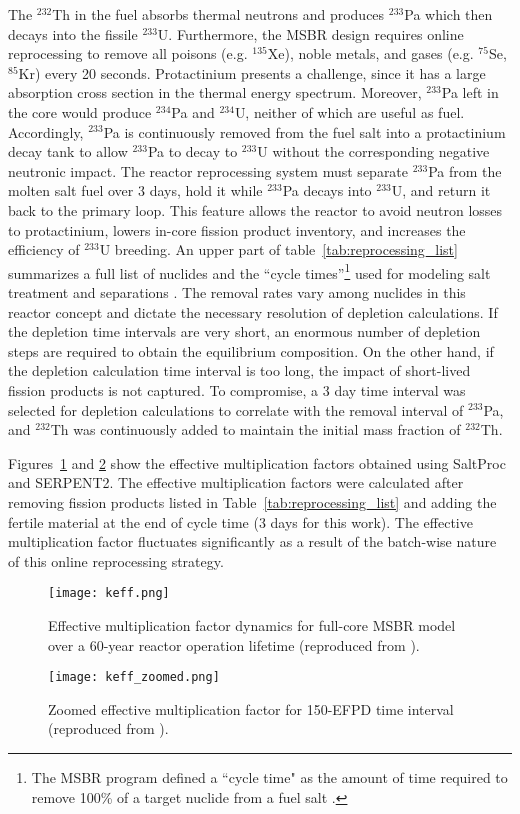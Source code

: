 The $^{232}$Th in the fuel absorbs thermal neutrons and produces $^{233}$Pa 
which then decays into the fissile $^{233}$U. Furthermore, the \gls{MSBR} 
design requires online reprocessing to remove all poisons (e.g. $^{135}$Xe), 
noble metals, and gases (e.g. $^{75}$Se, $^{85}$Kr) every 20 seconds. 
Protactinium presents a challenge, since it has a large absorption cross 
section in the thermal energy spectrum. Moreover, $^{233}$Pa left in the core
would produce $^{234}$Pa and $^{234}$U, neither of which are useful as fuel. 
Accordingly, $^{233}$Pa is continuously 
removed from the fuel salt into a protactinium decay tank to allow $^{233}$Pa 
to decay to $^{233}$U without the corresponding negative neutronic impact. The reactor 
reprocessing system must separate $^{233}$Pa from the molten salt fuel over 3 
days, hold it while $^{233}$Pa decays into $^{233}$U, and return it back to the 
primary loop. This feature allows the reactor to avoid neutron losses to 
protactinium, lowers in-core fission product inventory, and increases the 
efficiency of $^{233}$U breeding. An upper part of table~\ref{tab:reprocessing_list} 
summarizes a full list of nuclides and the ``cycle times''\footnote{ The \gls{MSBR} 
program defined a ``cycle time" as the amount of time required to remove 100\% of 
a target nuclide from a fuel 
salt \cite{robertson_conceptual_1971}.} used for modeling salt treatment and 
separations \cite{robertson_conceptual_1971}. 
The removal rates vary among nuclides in this reactor concept and dictate the 
necessary resolution of depletion calculations. If the depletion time intervals 
are very short, an enormous number of depletion steps are required to obtain 
the equilibrium composition. On the other hand, if the depletion  calculation 
time interval is too long, the impact of short-lived fission products is not 
captured. To compromise, a 3 day time interval was selected for depletion 
calculations to correlate with the removal interval of 
$^{233}$Pa, and $^{232}$Th was continuously added to maintain the initial mass 
fraction of $^{232}$Th.

Figures~\ref{fig:keff} and \ref{fig:keff_zoomed} show the effective multiplication factors 
obtained using SaltProc and SERPENT2. The effective multiplication factors were 
calculated after removing fission products listed in 
Table~\ref{tab:reprocessing_list} and adding the fertile material at the end of 
cycle time (3 days for this work). The effective multiplication 
factor fluctuates significantly as a result of the batch-wise nature of this 
online reprocessing strategy. 
\begin{figure}[ht!] 
  \centering
  \texttt{[image: keff.png]}
  \caption{Effective multiplication factor dynamics for full-core \gls{MSBR} 
  model over a 60-year reactor operation lifetime (reproduced from 
  \cite{rykhlevskii_modeling_2019}).}
  \label{fig:keff}
\end{figure}
\begin{figure}[ht!] 
  \centering
  \texttt{[image: keff\_zoomed.png]}
  \caption{Zoomed effective multiplication factor for 150-EFPD time interval 
  (reproduced from \cite{rykhlevskii_modeling_2019}).}
  \label{fig:keff_zoomed}
\end{figure}

